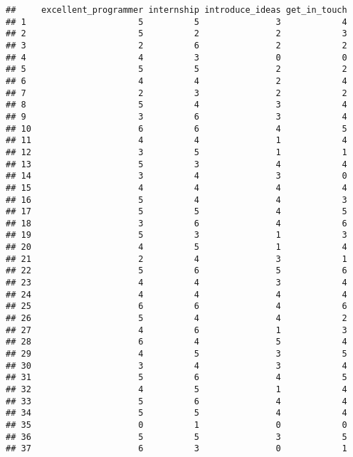 \documentclass[
]{article}
\begin{document}
\begin{verbatim}
##     excellent_programmer internship introduce_ideas get_in_touch
## 1                      5          5               3            4
## 2                      5          2               2            3
## 3                      2          6               2            2
## 4                      4          3               0            0
## 5                      5          5               2            2
## 6                      4          4               2            4
## 7                      2          3               2            2
## 8                      5          4               3            4
## 9                      3          6               3            4
## 10                     6          6               4            5
## 11                     4          4               1            4
## 12                     3          5               1            1
## 13                     5          3               4            4
## 14                     3          4               3            0
## 15                     4          4               4            4
## 16                     5          4               4            3
## 17                     5          5               4            5
## 18                     3          6               4            6
## 19                     5          3               1            3
## 20                     4          5               1            4
## 21                     2          4               3            1
## 22                     5          6               5            6
## 23                     4          4               3            4
## 24                     4          4               4            4
## 25                     6          6               4            6
## 26                     5          4               4            2
## 27                     4          6               1            3
## 28                     6          4               5            4
## 29                     4          5               3            5
## 30                     3          4               3            4
## 31                     5          6               4            5
## 32                     4          5               1            4
## 33                     5          6               4            4
## 34                     5          5               4            4
## 35                     0          1               0            0
## 36                     5          5               3            5
## 37                     6          3               0            1

\end{verbatim}
\end{document}
